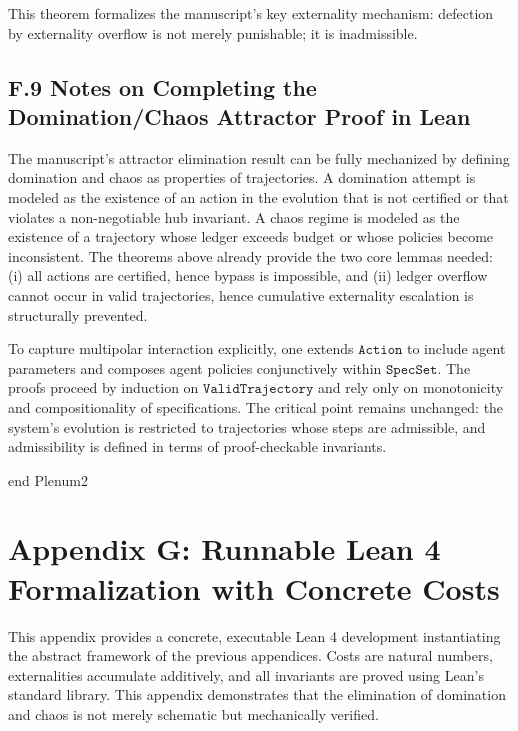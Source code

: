 \documentclass[11pt,oneside]{article}
\begin{document}
This theorem formalizes the manuscript’s key externality mechanism: defection by externality overflow is not merely punishable; it is inadmissible.

\subsection{F.9 Notes on Completing the Domination/Chaos Attractor Proof in Lean}

The manuscript’s attractor elimination result can be fully mechanized by defining domination and chaos as properties of trajectories. A domination attempt is modeled as the existence of an action in the evolution that is not certified or that violates a non-negotiable hub invariant. A chaos regime is modeled as the existence of a trajectory whose ledger exceeds budget or whose policies become inconsistent. The theorems above already provide the two core lemmas needed: (i) all actions are certified, hence bypass is impossible, and (ii) ledger overflow cannot occur in valid trajectories, hence cumulative externality escalation is structurally prevented.

To capture multipolar interaction explicitly, one extends \( \texttt{Action} \) to include agent parameters and composes agent policies conjunctively within \( \texttt{SpecSet} \). The proofs proceed by induction on \( \texttt{ValidTrajectory} \) and rely only on monotonicity and compositionality of specifications. The critical point remains unchanged: the system’s evolution is restricted to trajectories whose steps are admissible, and admissibility is defined in terms of proof-checkable invariants.

end Plenum2

\section{Appendix G: Runnable Lean 4 Formalization with Concrete Costs}

This appendix provides a concrete, executable Lean 4 development instantiating the abstract framework of the previous appendices. Costs are natural numbers, externalities accumulate additively, and all invariants are proved using Lean’s standard library. This appendix demonstrates that the elimination of domination and chaos is not merely schematic but mechanically verified.
\end{document}
